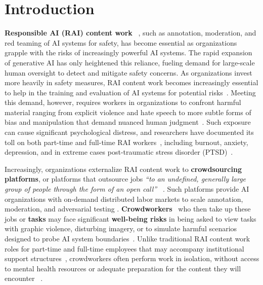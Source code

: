 \section{Introduction}

\textbf{Responsible AI (RAI) content work} ~\cite{qian2025aura}, such as annotation, moderation, and red teaming of AI systems for safety, has become essential as organizations grapple with the risks of increasingly powerful AI systems. The rapid expansion of generative AI has only heightened this reliance, fueling demand for large-scale human oversight to detect and mitigate safety concerns\cite{StanfordHAI2025AIIndex, GrandViewResearch2024GenerativeAI}. As organizations invest more heavily in safety measures, RAI content work becomes increasingly essential to help in the training and evaluation of AI systems for potential risks~\cite{udupa2023ethical}. Meeting this demand, however, requires workers in organizations to confront harmful material ranging from explicit violence and hate speech to more subtle forms of bias and manipulation that demand nuanced human judgment~\cite{qian2025aura}. Such exposure can cause significant psychological distress, and researchers have documented its toll on both part-time and full-time RAI workers~\cite{roberts2016commercial, qian2025aura}, including burnout, anxiety, depression, and in extreme cases post-traumatic stress disorder (PTSD)~\cite{alemadi2024emotional, martinez2024secondary, spence2025content, gebrekidan2024content}.

Increasingly, organizations externalize RAI content work to \textbf{crowdsourcing platforms}, or platforms that outsource jobs \textit{``to an undefined, generally large group of people through the form of an open call''} ~\cite{howe2006rise, berg2018digital}. Such platforms provide AI organizations with on-demand distributed labor markets to scale annotation, moderation, and adversarial testing \cite{udupa2023ethical, mann2025meta, egelman2014crowdsourcing}.
\textbf{Crowdworkers}~\cite{berg2018digital} who then take up these jobs or \textbf{tasks} may face significant \textbf{well-being risks} in being asked to view tasks with graphic violence, disturbing imagery, or to simulate harmful scenarios designed to probe AI system boundaries~\cite{qian2025locating}. 
Unlike traditional RAI content work roles for part-time and full-time employees that may accompany institutional support structures~\cite{qian2025aura, roberts2016commercial, steiger_psychological_2021}, crowdworkers often perform work in isolation, without access to mental health resources or adequate preparation for the content they will encounter ~\cite{schlicher2021flexible, berastegui2021exposure}. 


